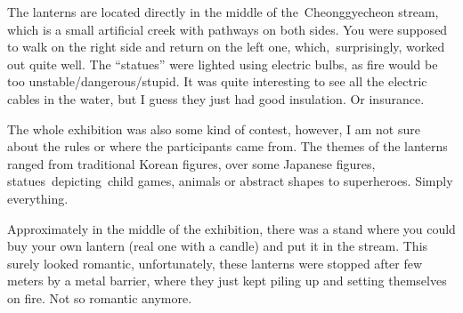 \begin{post}
\begin{content}
\begin{figure}
\vspace{-12pt}\centering{}
\vspace{-24pt}
\end{figure}The lanterns are located directly in the middle of the Cheong\-gye\-cheon stream, which is a small artificial creek with pathways on both sides. You were supposed to walk on the right side and return on the left one, which, surprisingly, worked out quite well. The ``statues'' were lighted using electric bulbs, as fire would be too unstable/dangerous/stupid. It was quite interesting to see all the electric cables in the water, but I guess they just had good insulation. Or insurance.

The whole exhibition was also some kind of contest, however, I am not sure about the rules or where the participants came from. The themes of the lanterns ranged from traditional Korean figures, over some Japanese figures, statues depicting child games, animals or abstract shapes to superheroes. Simply everything.

Approximately in the middle of the exhibition, there was a stand where you could buy your own lantern (real one with a candle) and put it in the stream. This surely looked romantic, unfortunately, these lanterns were stopped after few meters by a metal barrier, where they just kept piling up and setting themselves on fire. Not so romantic anymore.


\end{content}
\end{post}
